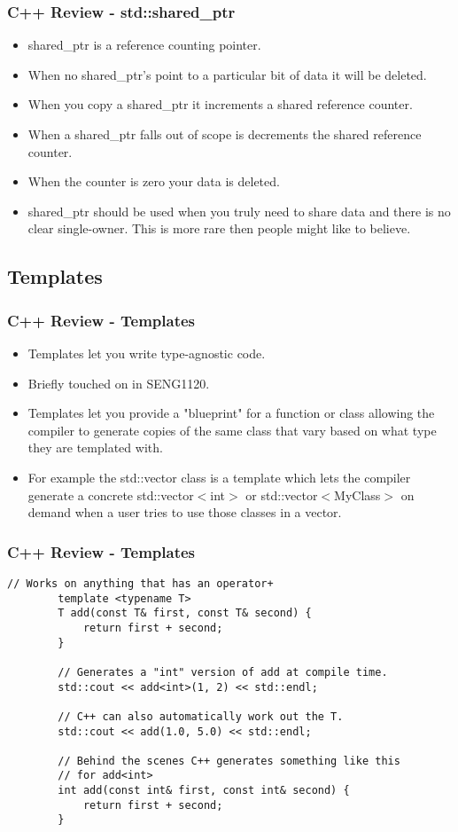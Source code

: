 \documentclass{beamer}
\begin{document}
\begin{frame}[fragile]
	\frametitle{C++ Review - std::shared\_ptr}
	\begin{itemize}
		\item shared\_ptr is a reference counting pointer.
		\item When no shared\_ptr's point to a particular bit of data it will be deleted.
		\item When you copy a shared\_ptr it increments a shared reference counter.
		\item When a shared\_ptr falls out of scope is decrements the shared reference counter.
		\item When the counter is zero your data is deleted.
		\item shared\_ptr should be used when you truly need to share data and there is no clear single-owner.
			This is more rare then people might like to believe.
	\end{itemize}
\end{frame}

\subsection{Templates}
\begin{frame}
	\frametitle{C++ Review - Templates}
	\begin{itemize}
		\item Templates let you write type-agnostic code.
		\item Briefly touched on in SENG1120.
		\item Templates let you provide a "blueprint" for a function or class allowing the compiler to generate
			copies of the same class that vary based on what type they are templated with.
		\item For example the std::vector class is a template which lets the compiler generate a concrete
			std::vector$<$int$>$ or std::vector$<$MyClass$>$ on demand when a user tries to use those classes
			in a vector.
	\end{itemize}
\end{frame}

\begin{frame}[fragile]
	\frametitle{C++ Review - Templates}
	\begin{lstlisting}[language=nuclear]
		// Works on anything that has an operator+
		template <typename T>
		T add(const T& first, const T& second) {
		    return first + second;
		}

		// Generates a "int" version of add at compile time.
		std::cout << add<int>(1, 2) << std::endl;

		// C++ can also automatically work out the T.
		std::cout << add(1.0, 5.0) << std::endl;

		// Behind the scenes C++ generates something like this
		// for add<int>
		int add(const int& first, const int& second) {
		    return first + second;
		}
	\end{lstlisting}
\end{frame}
\end{document}
